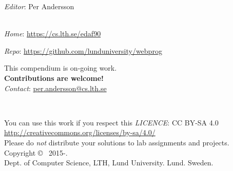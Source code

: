 
\clearpage\null\thispagestyle{empty}
\vfill

{
\setlength{\parindent}{0pt}
\emph{Editor}: Per Andersson \\


\\ \newline

\emph{Home}: \url{https://cs.lth.se/edaf90} \newline

\emph{Repo}: \url{https://github.com/lunduniversity/webprog} \\ \newline

This compendium is on-going work. \\ \textbf{Contributions are welcome!} \\
\emph{Contact}: \url{per.andersson@cs.lth.se}
\\ \newline

~\\ \newline

You can use this work if you respect this \emph{LICENCE}: CC BY-SA 4.0 \\
\url{http://creativecommons.org/licenses/by-sa/4.0/} \\
Please do \emph{not} distribute your solutions to lab assignments and projects.
\\ \newline
Copyright \copyright~ 2015-\CurrentYear. \\
Dept. of Computer Science, LTH, Lund University. Lund. Sweden.\\
}